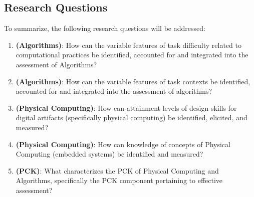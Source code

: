 

\subsection{Research Questions}


To summarize, the following research questions will be addressed:


\begin{enumerate}
\item \textbf{(Algorithms)}: How can the variable features of task difficulty related to computational practices be identified, accounted for and integrated into the assessment of Algorithms?
\item \textbf{(Algorithms)}: How can the variable features of task contexts be identified, accounted for and integrated into the assessment of algorithms?

\item \textbf{(Physical Computing)}: How can attainment levels of design skills for digital artifacts (specifically physical computing) be identified, elicited, and measured?
\item \textbf{(Physical Computing)}: How can knowledge of concepts of Physical Computing (embedded systems) be identified and measured?


\item \textbf{(PCK)}: What characterizes the PCK of Physical Computing and Algorithms, specifically the PCK component pertaining to effective assessment?

\end{enumerate}


%

%
%
%
%

